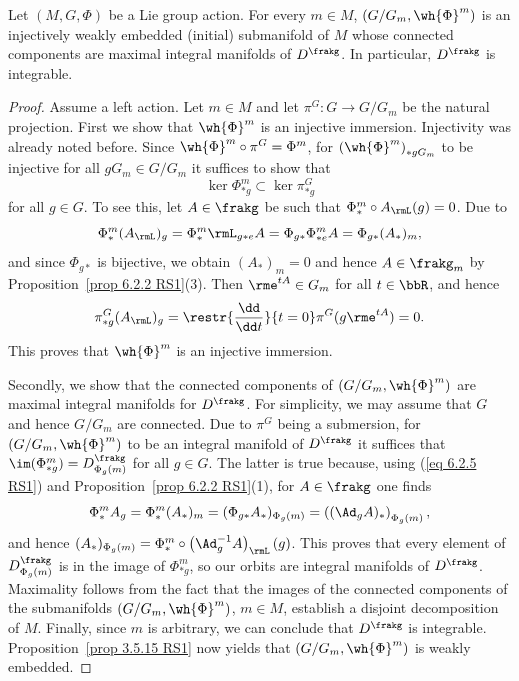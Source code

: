 \begin{thm}\label{thm 6.2.8 RS1 orbit}
    Let $(M,G,\Phi)$ be a Lie group action. For every $m\in M$, $(G\slash G_m,\wh{\Phi}^m)$ is an injectively weakly embedded (initial) submanifold of $M$ whose connected components are maximal integral manifolds of $D^\frakg$. In particular, $D^\frakg$ is integrable.
\end{thm}
\begin{proof}
    Assume a left action. Let $m\in M$ and let $\pi^G:G\to G\slash G_m$ be the natural projection. First we show that $\wh{\Phi}^m$ is an injective immersion. Injectivity was already noted before. Since $\wh{\Phi}^m\circ \pi^G=\Phi^m$, for $\left(\wh{\Phi}^m\right)_{\ast gG_m}$ to be injective for all $gG_m\in G\slash G_m$ it suffices to show that
    \[\ker \Phi^m_{\ast g}\subset \ker \pi^G_{\ast g}\]
    for all $g\in G$. To see this, let $A\in\frakg$ be such that $\Phi^m_{\ast}\circ A_\rmL(g)=0$. Due to
    \[\Phi^m_{\ast}(A_\rmL)_g=\Phi^m_{\ast}\rmL_{g\ast e}A=\Phi_{g\ast}\Phi^m_{\ast e}A=\Phi_{g\ast}(A_\ast)_m,\label{eq 6.2.5 RS1}\]
    and since $\Phi_{g\ast}$ is bijective, we obtain $(A_\ast)_m=0$ and hence $A\in\frakg_m$ by Proposition~\ref{prop 6.2.2 RS1}(3). Then $\rme^{tA}\in G_m$ for all $t\in\bbR$, and hence
    \[\pi^G_{\ast g}(A_\rmL)_g=\restr{\frac{\dd}{\dd t}}{t=0}\pi^G(g\rme^{tA})=0.\]
    This proves that $\wh{\Phi}^m$ is an injective immersion.

    Secondly, we show that the connected components of $(G\slash G_m,\wh{\Phi}^m)$ are maximal integral manifolds for $D^\frakg$. For simplicity, we may assume that $G$ and hence $G\slash G_m$ are connected. Due to $\pi^G$ being a submersion, for $(G\slash G_m,\wh{\Phi}^m)$ to be an integral manifold of $D^\frakg$ it suffices that $\im(\Phi^m_{\ast g})=D^\frakg_{\Phi_g(m)}$ for all $g\in G$. The latter is true because, using  (\ref{eq 6.2.5 RS1}) and Proposition~\ref{prop 6.2.2 RS1}(1), for $A\in\frakg$ one finds
    \[\Phi^m_{\ast}A_g=\Phi^m_{\ast}(A_\ast)_m=(\Phi_{g\ast}A_\ast)_{\Phi_g(m)}=\left((\Ad_g A)_\ast\right)_{\Phi_g(m)},\]
    and hence $(A_\ast)_{\Phi_g(m)}=\Phi^m_{\ast}\circ\left(\Ad_g^{-1}A\right)_\rmL(g)$. This proves that every element of $D^\frakg_{\Phi_g(m)}$ is in the image of $\Phi^m_{\ast g}$, so our orbits are integral manifolds of $D^\frakg$. Maximality follows from the fact that the images of the connected components of the submanifolds $(G\slash G_m,\wh{\Phi}^m)$, $m\in M$, establish a disjoint decomposition of $M$. Finally, since $m $ is arbitrary, we can conclude that $D^\frakg$ is integrable. Proposition~\ref{prop 3.5.15 RS1} now yields that $(G\slash G_m,\wh{\Phi}^m)$ is weakly embedded.
\end{proof}

